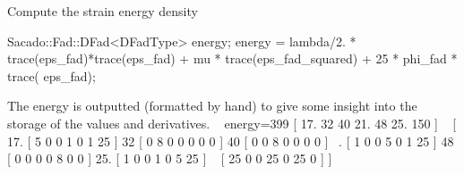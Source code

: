  Compute the strain energy density 
\begin{DoxyCode}
Sacado::Fad::DFad<DFadType> energy;
energy = lambda/2. * trace(eps\_fad)*trace(eps\_fad) + mu * trace(eps\_fad\_squared) + 25 * phi\_fad * trace(
      eps\_fad);
\end{DoxyCode}
 The energy is outputted (formatted by hand) to give some insight into the storage of the values and derivatives. ~\newline
energy=399 \mbox{[} 17. 32 40 21. 48 25. 150 \mbox{]} ~\newline
\mbox{[} 17. \mbox{[} 5 0 0 1 0 1 25 \mbox{]} 32 \mbox{[} 0 8 0 0 0 0 0 \mbox{]} 40 \mbox{[} 0 0 8 0 0 0 0 \mbox{]} ~. \mbox{[} 1 0 0 5 0 1 25 \mbox{]} 48 \mbox{[} 0 0 0 0 8 0 0 \mbox{]} 25. \mbox{[} 1 0 0 1 0 5 25 \mbox{]} ~ \mbox{[} 25 0 0 25 0 25 0 \mbox{]} \mbox{]}


